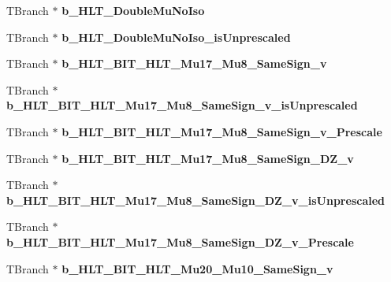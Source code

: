 \begin{DoxyCompactItemize}
T\+Branch $\ast$ {\bfseries b\+\_\+\+H\+L\+T\+\_\+\+Double\+Mu\+No\+Iso}
\item 
\hypertarget{classMiniTree_a38dcdd062951931cfb110a56a3714dc2}{}\label{classMiniTree_a38dcdd062951931cfb110a56a3714dc2} 
T\+Branch $\ast$ {\bfseries b\+\_\+\+H\+L\+T\+\_\+\+Double\+Mu\+No\+Iso\+\_\+is\+Unprescaled}
\item 
\hypertarget{classMiniTree_adcd7ad467d1379b14c86de513cfbad8a}{}\label{classMiniTree_adcd7ad467d1379b14c86de513cfbad8a} 
T\+Branch $\ast$ {\bfseries b\+\_\+\+H\+L\+T\+\_\+\+B\+I\+T\+\_\+\+H\+L\+T\+\_\+\+Mu17\+\_\+\+Mu8\+\_\+\+Same\+Sign\+\_\+v}
\item 
\hypertarget{classMiniTree_a7bbed7d2e9402eb44795a2356f2db636}{}\label{classMiniTree_a7bbed7d2e9402eb44795a2356f2db636} 
T\+Branch $\ast$ {\bfseries b\+\_\+\+H\+L\+T\+\_\+\+B\+I\+T\+\_\+\+H\+L\+T\+\_\+\+Mu17\+\_\+\+Mu8\+\_\+\+Same\+Sign\+\_\+v\+\_\+is\+Unprescaled}
\item 
\hypertarget{classMiniTree_ae897e2caacedc524ad21b2c43b48d7e3}{}\label{classMiniTree_ae897e2caacedc524ad21b2c43b48d7e3} 
T\+Branch $\ast$ {\bfseries b\+\_\+\+H\+L\+T\+\_\+\+B\+I\+T\+\_\+\+H\+L\+T\+\_\+\+Mu17\+\_\+\+Mu8\+\_\+\+Same\+Sign\+\_\+v\+\_\+\+Prescale}
\item 
\hypertarget{classMiniTree_a6e8b6daf17c7b599601bb01db94d0e25}{}\label{classMiniTree_a6e8b6daf17c7b599601bb01db94d0e25} 
T\+Branch $\ast$ {\bfseries b\+\_\+\+H\+L\+T\+\_\+\+B\+I\+T\+\_\+\+H\+L\+T\+\_\+\+Mu17\+\_\+\+Mu8\+\_\+\+Same\+Sign\+\_\+\+D\+Z\+\_\+v}
\item 
\hypertarget{classMiniTree_ad71a08e576742506a3c58eb54e004b1b}{}\label{classMiniTree_ad71a08e576742506a3c58eb54e004b1b} 
T\+Branch $\ast$ {\bfseries b\+\_\+\+H\+L\+T\+\_\+\+B\+I\+T\+\_\+\+H\+L\+T\+\_\+\+Mu17\+\_\+\+Mu8\+\_\+\+Same\+Sign\+\_\+\+D\+Z\+\_\+v\+\_\+is\+Unprescaled}
\item 
\hypertarget{classMiniTree_a414c7587ebdc0e6609b1b4f14c701313}{}\label{classMiniTree_a414c7587ebdc0e6609b1b4f14c701313} 
T\+Branch $\ast$ {\bfseries b\+\_\+\+H\+L\+T\+\_\+\+B\+I\+T\+\_\+\+H\+L\+T\+\_\+\+Mu17\+\_\+\+Mu8\+\_\+\+Same\+Sign\+\_\+\+D\+Z\+\_\+v\+\_\+\+Prescale}
\item 
\hypertarget{classMiniTree_a1aeb1a924b1911fa974f90aba41c8bac}{}\label{classMiniTree_a1aeb1a924b1911fa974f90aba41c8bac} 
T\+Branch $\ast$ {\bfseries b\+\_\+\+H\+L\+T\+\_\+\+B\+I\+T\+\_\+\+H\+L\+T\+\_\+\+Mu20\+\_\+\+Mu10\+\_\+\+Same\+Sign\+\_\+v}
\item 
\hypertarget{classMiniTree_a91f357ff822b54276ca97cdcdb676be9}{}\label{classMiniTree_a91f357ff822b54276ca97cdcdb676be9} 

\end{DoxyCompactItemize}
